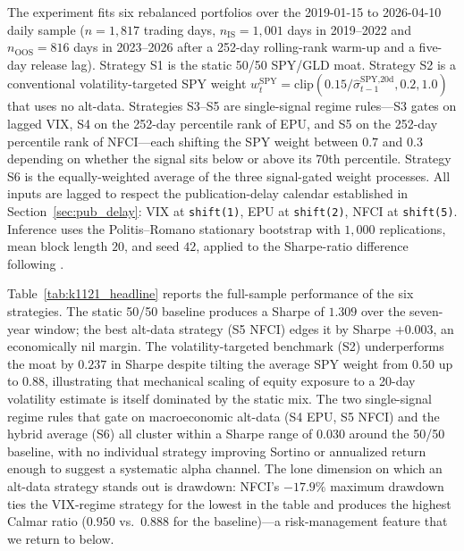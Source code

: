 \documentclass[12pt,a4paper]{article}
\begin{document}
The experiment fits six rebalanced portfolios over the 2019-01-15 to 2026-04-10 daily sample ($n=1{,}817$ trading days, $n_{\text{IS}}=1{,}001$ days in 2019--2022 and $n_{\text{OOS}}=816$ days in 2023--2026 after a 252-day rolling-rank warm-up and a five-day release lag). Strategy S1 is the static 50/50 SPY/GLD moat. Strategy S2 is a conventional volatility-targeted SPY weight $w_t^{\text{SPY}} = \mathrm{clip}(0.15/\hat\sigma_{t-1}^{\text{SPY,20d}}, 0.2, 1.0)$ that uses no alt-data. Strategies S3--S5 are single-signal regime rules---S3 gates on lagged VIX, S4 on the 252-day percentile rank of EPU, and S5 on the 252-day percentile rank of NFCI---each shifting the SPY weight between $0.7$ and $0.3$ depending on whether the signal sits below or above its 70th percentile. Strategy S6 is the equally-weighted average of the three signal-gated weight processes. All inputs are lagged to respect the publication-delay calendar established in Section~\ref{sec:pub_delay}: VIX at \texttt{shift(1)}, EPU at \texttt{shift(2)}, NFCI at \texttt{shift(5)}. Inference uses the Politis--Romano stationary bootstrap \citep{politis1994} with $1{,}000$ replications, mean block length $20$, and seed $42$, applied to the Sharpe-ratio difference following \citet{opdyke2007}.

Table~\ref{tab:k1121_headline} reports the full-sample performance of the six strategies. The static 50/50 baseline produces a Sharpe of $1.309$ over the seven-year window; the best alt-data strategy (S5 NFCI) edges it by Sharpe $+0.003$, an economically nil margin. The volatility-targeted benchmark (S2) underperforms the moat by $0.237$ in Sharpe despite tilting the average SPY weight from $0.50$ up to $0.88$, illustrating that mechanical scaling of equity exposure to a 20-day volatility estimate is itself dominated by the static mix. The two single-signal regime rules that gate on macroeconomic alt-data (S4 EPU, S5 NFCI) and the hybrid average (S6) all cluster within a Sharpe range of $0.030$ around the 50/50 baseline, with no individual strategy improving Sortino or annualized return enough to suggest a systematic alpha channel. The lone dimension on which an alt-data strategy stands out is drawdown: NFCI's $-17.9\%$ maximum drawdown ties the VIX-regime strategy for the lowest in the table and produces the highest Calmar ratio ($0.950$ vs.\ $0.888$ for the baseline)---a risk-management feature that we return to below.
\end{document}
